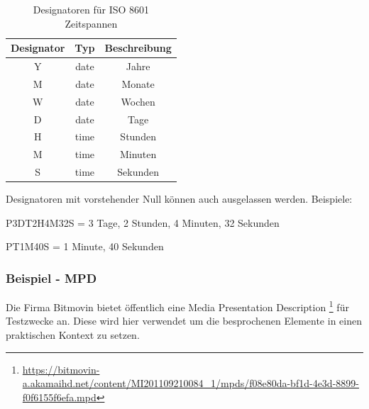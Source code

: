 \documentclass[paper = a4, fontsize = 12pt, parskip = half]{scrartcl} %
\begin{document}
\begin{center}
    \begin{table}[ht]
        \label{iso_duration_designators}
        \centering
        \begin{tabular}{|c|c|c|}
            \hline
                \textbf{Designator} & \textbf{Typ} & \textbf{Beschreibung} \\
            \hline
            \hline
            Y & date & Jahre \\
            \hline
            M & date & Monate \\
            \hline
            W & date & Wochen \\
            \hline
            D & date & Tage \\
            \hline
            \hline
            H & time & Stunden \\
            \hline
            M & time & Minuten \\
            \hline
            S & time & Sekunden \\
            \hline
        \end{tabular}
        \caption{Designatoren für ISO 8601 Zeitspannen}
    \end{table}
\end{center}
Designatoren mit vorstehender Null können auch ausgelassen werden. Beispiele:

P3DT2H4M32S = 3 Tage, 2 Stunden, 4 Minuten, 32 Sekunden

PT1M40S = 1 Minute, 40 Sekunden

\subsubsection{Beispiel - MPD}
 Die Firma Bitmovin bietet öffentlich eine Media Presentation Description \footnote{\url{https://bitmovin-a.akamaihd.net/content/MI201109210084_1/mpds/f08e80da-bf1d-4e3d-8899-f0f6155f6efa.mpd}} für Testzwecke an. Diese wird hier verwendet um die besprochenen Elemente in einen praktischen Kontext zu setzen.
\end{document}
